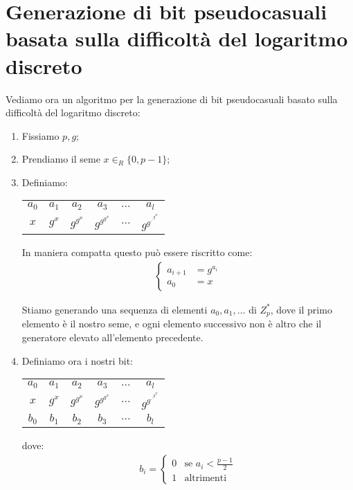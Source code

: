 \section{Generazione di bit pseudocasuali basata sulla difficoltà del logaritmo discreto}
Vediamo ora un algoritmo per la generazione di bit pseudocasuali basato sulla difficoltà del logaritmo discreto:
\begin{enumerate}
    \item Fissiamo $p, g$;
    \item Prendiamo il seme $x \in_R \{0, p-1\}$;
    \item Definiamo:
        \begin{center}
            \begin{tabular}{ c c c c c c }
              $a_0$ & $a_1$ & $a_2$ & $a_3$ & $...$ & $a_l$\\
              \vspace{1cm}
              $x$ & $g^x$ & $g^{g^x}$ & $g^{g^{g^x}}$ & $...$ & $g^{g^{.^{.^{g^x}}}}$  
            \end{tabular}
        \end{center}
    In maniera compatta questo può essere riscritto come:
    \begin{align*}
         \begin{cases}
            a_{i+1} &= g^{a_i}\\
            a_0 &= x
        \end{cases}
    \end{align*}

    Stiamo generando una sequenza di elementi $a_0, a_1, ...$ di $Z_p^*$, dove il primo elemento è il nostro seme, e ogni elemento successivo non è altro che il generatore elevato all'elemento precedente.

    \item Definiamo ora i nostri bit:
    \begin{center}
            \begin{tabular}{ c c c c c c }
              $a_0$ & $a_1$ & $a_2$ & $a_3$ & $...$ & $a_l$\\
              \vspace{1cm}
              $x$ & $g^x$ & $g^{g^x}$ & $g^{g^{g^x}}$ & $...$ & $g^{g^{.^{.^{g^x}}}}$\\
              \vspace{1cm}
              $b_0$ & $b_1$ & $b_2$ & $b_3$ & $...$ & $b_l$\\
            \end{tabular}
        \end{center}
    dove:
    \begin{align*}
         b_i = \begin{cases}
            0 & \mbox{se } a_i < \frac{p-1}{2}\\ 
            1 & \mbox{altrimenti}
        \end{cases}
    \end{align*}


\end{enumerate}
